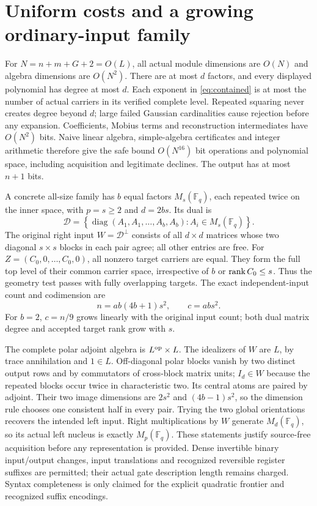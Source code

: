 \documentclass[11pt]{article}
\newcommand{\F}{\mathbb F}\newcommand{\End}{\operatorname{End}}
\begin{document}
\section{Uniform costs and a growing ordinary-input family}
For $N=n+m+G+2=O(L)$, all actual module dimensions are $O(N)$ and algebra
dimensions are $O(N^2)$. There are at most $d$ factors, and every displayed
polynomial has degree at most $d$. Each exponent in \eqref{eq:contained} is
at most the number of actual carriers in its verified complete level.
Repeated squaring never creates degree beyond $d$; large failed Gaussian
cardinalities cause rejection before any expansion. Coefficients, Mobius
terms and reconstruction intermediates have $O(N^2)$ bits. Naive linear
algebra, simple-algebra certificates and integer arithmetic therefore give
the safe bound $O(N^{16})$ bit operations and polynomial space, including
acquisition and legitimate declines. The output has at most $n+1$ bits.

A concrete all-size family has $b$ equal factors $M_s(\F_q)$, each repeated
twice on the inner space, with $p=s\ge2$ and $d=2bs$. Its dual is
\[
 \mathcal D=\left\{\operatorname{diag}(A_1,A_1,\ldots,A_b,A_b):
                  A_i\in M_s(\F_q)\right\}.
\]
The original right input $W=\mathcal D^\perp$ consists of all $d\times d$
matrices whose two diagonal $s\times s$ blocks in each pair agree; all other
entries are free. For $Z=(C_0,0,\ldots,C_0,0)$, all nonzero target carriers
are equal. They form the full top level of their common carrier space,
irrespective of $b$ or $\operatorname{rank} C_0\le s$. Thus the geometry test passes with
fully overlapping targets. The exact independent-input count and codimension
are
\[
 n=ab(4b+1)s^2,\qquad c=ab s^2.
\]
For $b=2$, $c=n/9$ grows linearly with the original input count; both dual
matrix degree and accepted target rank grow with $s$.

The complete polar adjoint algebra is $L^{\rm op}\times L$. The idealizers
of $W$ are $L$, by trace annihilation and $1\in L$. Off-diagonal polar
blocks vanish by two distinct output rows and by commutators of cross-block
matrix units; $I_d\in W$ because the repeated blocks occur twice in
characteristic two. Its central atoms are paired by adjoint. Their two
image dimensions are $2s^2$ and $(4b-1)s^2$, so the dimension rule chooses
one consistent half in every pair. Trying the two global orientations
recovers the intended left input. Right multiplications by $W$ generate
$M_d(\F_q)$, so its actual left nucleus is exactly $M_p(\F_q)$.
These statements justify source-free acquisition before any representation
is provided. Dense invertible binary input/output changes, input translations
and recognized reversible register suffixes are permitted; their actual gate
description length remains charged. Syntax completeness is only claimed for
the explicit quadratic frontier and recognized suffix encodings.
\end{document}
